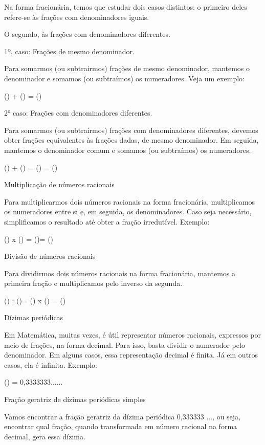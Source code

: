 Na forma fracionária, temos que estudar dois casos distintos: o primeiro
deles refere-se às frações com denominadores iguais.

O segundo, às frações com denominadores diferentes.

1º. caso: Frações de mesmo denominador.

Para somarmos (ou subtrairmos) frações de mesmo denominador, mantemos o
denominador e somamos (ou subtraímos) os numeradores. Veja um exemplo:

() + () = ()

2° caso: Frações com denominadores diferentes.

Para somarmos (ou subtrairmos) frações com denominadores diferentes,
devemos obter frações equivalentes às frações dadas, de mesmo
denominador. Em seguida, mantemos o denominador comum e somamos (ou
subtraímos) os numeradores.

() + () = () =
()

Multiplicação de números racionais

Para multiplicarmos dois números racionais na forma fracionária,
multiplicamos os numeradores entre si e, em seguida, os denominadores.
Caso seja necessário, simplificamos o resultado até obter a fração
irredutível. Exemplo:

() x () = ()= ()

Divisão de números racionais

Para dividirmos dois números racionais na forma fracionária, mantemos a
primeira fração e multiplicamos pelo inverso da segunda.

() : ()= () x () =
()

Dízimas periódicas

Em Matemática, muitas vezes, é útil representar números racionais,
expressos por meio de frações, na forma decimal. Para isso, basta
dividir o numerador pelo denominador. Em alguns casos, essa
representação decimal é finita. Já em outros casos, ela é infinita.
Exemplo:

() = 0,3333333......

Fração geratriz de dízimas periódicas simples

Vamos encontrar a fração geratriz da dízima periódica 0,333333 ..., ou
seja, encontrar qual fração, quando transformada em número racional na
forma decimal, gera essa dízima.

